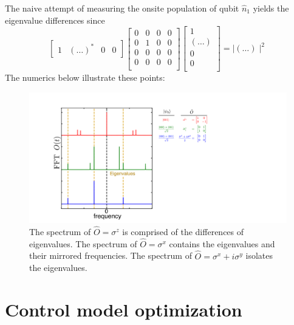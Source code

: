 The naive attempt of measuring the onsite population of qubit $\hat{n}_1$ yields the eigenvalue differences since
\begin{equation}
    \begin{bmatrix}
        1 & (\ldots)^* & 0 & 0
    \end{bmatrix}
    \begin{bmatrix}
        0 & 0 & 0 & 0 \\
        0 & 1 & 0 & 0 \\
        0 & 0 & 0 & 0 \\
        0 & 0 & 0 & 0 \\
    \, \end{bmatrix}
    \begin{bmatrix}
        1 \\
        (\ldots) \\
        0 \\
        0 \\
    \end{bmatrix}
    = \mid (\ldots) \mid^{2}
\end{equation}
The numerics below illustrate these points:
\begin{figure}[h]
    \begin{center}
        \includegraphics[width=250 mm]{./PDF/mbr_numerics_3qubit_o_psi0.pdf}
    \end{center}
    \caption{
    The spectrum of $\hat{O} = \sigma^z$ is comprised of the differences of eigenvalues.
    The spectrum of $\hat{O} = \sigma^x$ contains the eigenvalues and their mirrored frequencies.
    The spectrum of $\hat{O} = \sigma^x + i \sigma^y$ isolates the eigenvalues.
    }
    \label{mbr_peaks_numerics}
\end{figure}

\section{Control model optimization}

